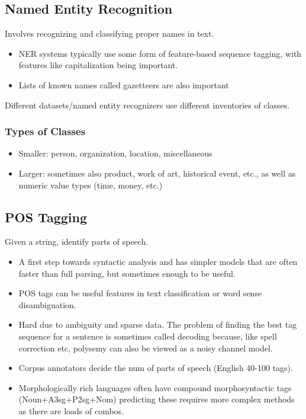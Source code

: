 \documentclass[8pt]{extarticle} %
\begin{document}
\begin{multicols*}{3}
\subsection*{Named Entity Recognition}
Involves recognizing and classifying proper names in text.
\begin{itemize}[label=\textbullet, labelsep=0.3em, leftmargin=0.5em, itemsep=0em]
\item NER systems typically use some form of feature-based sequence tagging, with features like capitalization being important.
\item Lists of known names called gazetteers are also important
\end{itemize}
Different datasets/named entity recognizers use different inventories of classes.\\

\subsubsection*{Types of Classes}
\begin{itemize}[label=\textbullet, labelsep=0.3em, leftmargin=0.5em, itemsep=0em]
\item Smaller: person, organization, location, miscellaneous
\item Larger: sometimes also product, work of art, historical event, etc., as well as numeric value types (time, money, etc.)\\
\end{itemize}

\subsection*{POS Tagging}
Given a string, identify parts of speech.
\begin{itemize}[label=\textbullet, labelsep=0.3em, leftmargin=0.5em, itemsep=0em]
\item A first step towards syntactic analysis and has simpler models that are often faster than full parsing, but sometimes enough to be useful.
\item POS tags can be useful features in text classification or word sense disambiguation. 
\item Hard due to ambiguity and sparse data. The problem of finding the best tag sequence for a sentence is sometimes called decoding because, like spell correction etc, polysemy can also be viewed as a noisy channel model.
\item Corpus annotators decide the num of parts of speech (English 40-100 tags). 
\item Morphologically rich languages often have compound morphosyntactic tags (Noun+A3sg+P2sg+Nom) predicting these requires more complex methods as there are loads of combos. 
\end{itemize}


\end{multicols*}
\end{document}
